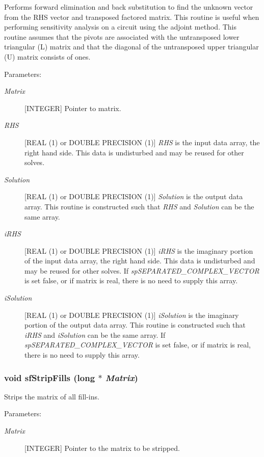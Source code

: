 Performs forward elimination and back substitution to find the unknown vector from the RHS vector and transposed factored matrix. This routine is useful when performing sensitivity analysis on a circuit using the adjoint method. This routine assumes that the pivots are associated with the untransposed lower triangular (L) matrix and that the diagonal of the untransposed upper triangular (U) matrix consists of ones.\begin{Desc}
\item[Parameters: ]\par
\begin{description}
\item[{\em 
Matrix}][INTEGER] Pointer to matrix. \item[{\em 
RHS}][REAL (1) or DOUBLE PRECISION (1)] {\em RHS} is the input data array, the right hand side. This data is undisturbed and may be reused for other solves. \item[{\em 
Solution}][REAL (1) or DOUBLE PRECISION (1)] {\em Solution} is the output data array. This routine is constructed such that {\em RHS} and {\em Solution} can be the same array. \item[{\em 
i\-RHS}][REAL (1) or DOUBLE PRECISION (1)] {\em i\-RHS} is the imaginary portion of the input data array, the right hand side. This data is undisturbed and may be reused for other solves. If {\em sp\-SEPARATED\_\-COMPLEX\_\-VECTOR} is set false, or if matrix is real, there is no need to supply this array. \item[{\em 
i\-Solution}][REAL (1) or DOUBLE PRECISION (1)] {\em i\-Solution} is the imaginary portion of the output data array. This routine is constructed such that {\em i\-RHS} and {\em i\-Solution} can be the same array. If {\em sp\-SEPARATED\_\-COMPLEX\_\-VECTOR} is set false, or if matrix is real, there is no need to supply this array. \end{description}
\end{Desc}
\subsubsection{\setlength{\rightskip}{0pt plus 5cm}void sf\-Strip\-Fills (long $\ast$ {\em Matrix})}\label{spFortran_8c_a49}


Strips the matrix of all fill-ins.\begin{Desc}
\item[Parameters: ]\par
\begin{description}
\item[{\em 
Matrix}][INTEGER] Pointer to the matrix to be stripped. \end{description}
\end{Desc}
